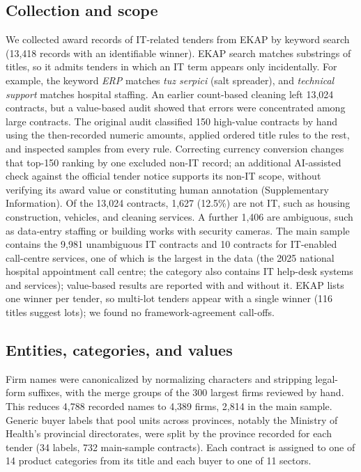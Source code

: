 \documentclass[pdflatex,sn-apa]{sn-jnl}
\begin{document}
\subsection{Collection and scope}
We collected award records of IT-related tenders from EKAP by keyword search (13,418 records with an identifiable winner). EKAP search matches substrings of titles, so it admits tenders in which an IT term appears only incidentally. For example, the keyword \emph{ERP} matches \emph{tuz serpici} (salt spreader), and \emph{technical support} matches hospital staffing. An earlier count-based cleaning left 13,024 contracts, but a value-based audit showed that errors were concentrated among large contracts. The original audit classified 150 high-value contracts by hand using the then-recorded numeric amounts, applied ordered title rules to the rest, and inspected samples from every rule. Correcting currency conversion changes that top-150 ranking by one excluded non-IT record; an additional AI-assisted check against the official tender notice supports its non-IT scope, without verifying its award value or constituting human annotation (Supplementary Information). Of the 13,024 contracts, 1,627 (12.5\%) are not IT, such as housing construction, vehicles, and cleaning services. A further 1,406 are ambiguous, such as data-entry staffing or building works with security cameras. The main sample contains the 9,981 unambiguous IT contracts and 10 contracts for IT-enabled call-centre services, one of which is the largest in the data (the 2025 national hospital appointment call centre; the category also contains IT help-desk systems and services); value-based results are reported with and without it. EKAP lists one winner per tender, so multi-lot tenders appear with a single winner (116 titles suggest lots); we found no framework-agreement call-offs.

\subsection{Entities, categories, and values}
Firm names were canonicalized by normalizing characters and stripping legal-form suffixes, with the merge groups of the 300 largest firms reviewed by hand. This reduces 4,788 recorded names to 4,389 firms, 2,814 in the main sample. Generic buyer labels that pool units across provinces, notably the Ministry of Health's provincial directorates, were split by the province recorded for each tender (34 labels, 732 main-sample contracts). Each contract is assigned to one of 14 product categories from its title and each buyer to one of 11 sectors.
\end{document}
